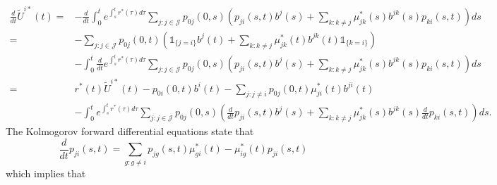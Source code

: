 \documentclass[12pt]{article}
\newcommand{\indic}[1]{\mathds{1}_{ \{ #1 \} }}
\theoremstyle{my_thm}
\begin{document}
\begin{align*}
\frac{d}{dt} \tilde{U}^{i*}(t)=& -\frac{d}{dt} 
\int_0^t e^{\int_s^t r^*(\tau) d\tau} \sum_{j:j \in \mathcal{J}} p_{0j}(0,s) \left(p_{ji}(s,t)   b^{j}(s) + \sum_{k:k \neq j}  \mu^*_{jk}(s) b^{jk}(s) p_{ki}(s,t) \right) ds
\\
=&
-\sum_{j:j \in \mathcal{J}} p_{0j}(0,t) \left( \indic{j=i}   b^{j}(t) + \sum_{k:k \neq j}  \mu^*_{jk}(t) b^{jk}(t) \indic{k=i}  \right) 
\\
&-
\int_0^t \frac{d}{dt} e^{\int_s^t r^*(\tau) d\tau} \sum_{j:j \in \mathcal{J}} p_{0j}(0,s) \left(p_{ji}(s,t)   b^{j}(s) + \sum_{k:k \neq j}  \mu^*_{jk}(s) b^{jk}(s) p_{ki}(s,t) \right) ds
\\
=&
r^*(t)\tilde{U}^{i*}(t)-p_{0i}(0,t) b^{i}(t) -\sum_{j:j \neq i} p_{0j}(0,t) \mu^*_{ji}(t) b^{ji}(t) 
\\
&-
\int_0^t e^{\int_s^t r^*(\tau) d\tau} \sum_{j:j \in \mathcal{J}} p_{0j}(0,s) \left( \frac{d}{dt}p_{ji}(s,t)   b^{j}(s) + \sum_{k:k \neq j}  \mu^*_{jk}(s) b^{jk}(s) \frac{d}{dt} p_{ki}(s,t) \right) ds.
\end{align*}
The Kolmogorov forward differential equations state that
$$
\frac{d}{dt}p_{ji}(s,t)=\sum_{g:g \neq i} p_{jg}(s,t)\mu^*_{gi}(t) - \mu^*_{ig}(t)p_{ji}(s,t)
$$
which implies that
\end{document}
